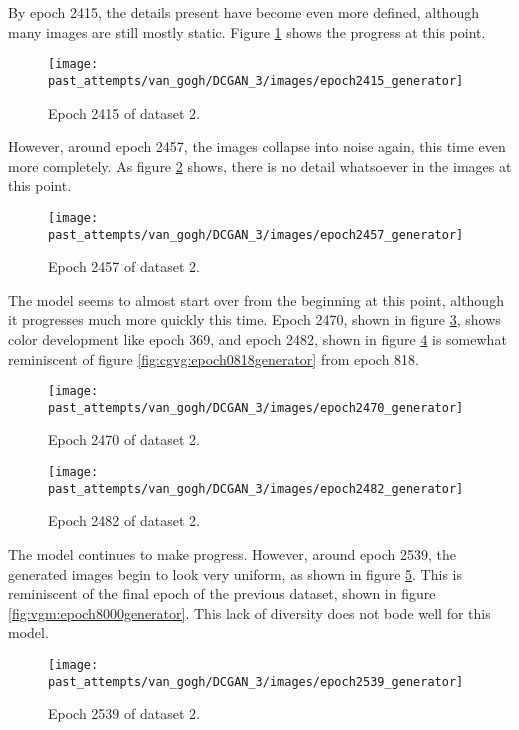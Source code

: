 \documentclass[11pt,letterpaper]{article}
\begin{document}
				By epoch 2415, the details present have become even more defined, although many images are still mostly static.
				Figure \ref{fig:cgvg:epoch2415generator} shows the progress at this point.
				\begin{figure}
					\centering
					\texttt{[image: past\_attempts/van\_gogh/DCGAN\_3/images/epoch2415\_generator]}
					\caption{Epoch 2415 of dataset 2.}
					\label{fig:cgvg:epoch2415generator}
				\end{figure}

				However, around epoch 2457, the images collapse into noise again, this time even more completely.
				As figure \ref{fig:cgvg:epoch2457generator} shows, there is no detail whatsoever in the images at this point.
				\begin{figure}
					\centering
					\texttt{[image: past\_attempts/van\_gogh/DCGAN\_3/images/epoch2457\_generator]}
					\caption{Epoch 2457 of dataset 2.}
					\label{fig:cgvg:epoch2457generator}
				\end{figure}

				The model seems to almost start over from the beginning at this point, although it progresses much more quickly this time.
				Epoch 2470, shown in figure \ref{fig:cgvg:epoch2470generator}, shows color development like epoch 369, and epoch 2482, shown in figure \ref{fig:cgvg:epoch2482generator} is somewhat reminiscent of figure \ref{fig:cgvg:epoch0818generator} from epoch 818.
				\begin{figure}
					\centering
					\texttt{[image: past\_attempts/van\_gogh/DCGAN\_3/images/epoch2470\_generator]}
					\caption{Epoch 2470 of dataset 2.}
					\label{fig:cgvg:epoch2470generator}
				\end{figure}

				\begin{figure}
					\centering
					\texttt{[image: past\_attempts/van\_gogh/DCGAN\_3/images/epoch2482\_generator]}
					\caption{Epoch 2482 of dataset 2.}
					\label{fig:cgvg:epoch2482generator}
				\end{figure}

				The model continues to make progress.
				However, around epoch 2539, the generated images begin to look very uniform, as shown in figure \ref{fig:cgvg:epoch2539generator}.
				This is reminiscent of the final epoch of the previous dataset, shown in figure \ref{fig:vgm:epoch8000generator}.
				This lack of diversity does not bode well for this model.
				\begin{figure}
					\centering
					\texttt{[image: past\_attempts/van\_gogh/DCGAN\_3/images/epoch2539\_generator]}
					\caption{Epoch 2539 of dataset 2.}
					\label{fig:cgvg:epoch2539generator}
				\end{figure}
\end{document}
